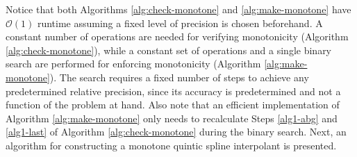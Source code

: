 \documentclass{scspaperproc}
\theoremstyle{scsthe}
\begin{document}
Notice that both Algorithms \ref{alg:check-monotone} and \ref{alg:make-monotone} have $\mathcal{O}(1)$ runtime assuming a fixed level of precision is chosen beforehand. A constant number of operations are needed for verifying monotonicity (Algorithm \ref{alg:check-monotone}), while a constant set of operations and a single binary search are performed for enforcing monotonicity (Algorithm \ref{alg:make-monotone}). The search requires a fixed number of steps to achieve any predetermined relative precision, since its accuracy is predetermined and not a function of the problem at hand. Also note that an efficient implementation of Algorithm \ref{alg:make-monotone} only needs to recalculate Steps \ref{alg1-abg} and \ref{alg1-last} of Algorithm \ref{alg:check-monotone} during the binary search. Next, an algorithm for constructing a monotone quintic spline interpolant is presented.

\end{document}
